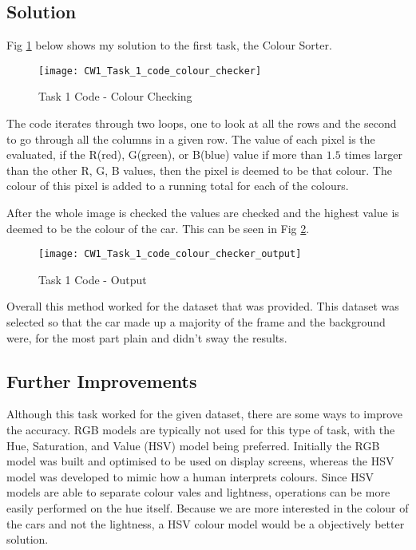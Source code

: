 \documentclass[conference]{IEEEtran}
\begin{document}
\subsection{Solution}
Fig \ref{fig:CW1_Task_1_code_colour_checker} below shows my solution to the first task, the Colour Sorter.

\begin{figure}[H]
\centerline{\texttt{[image: CW1\_Task\_1\_code\_colour\_checker]}}
\caption{Task 1 Code - Colour Checking}
\label{fig:CW1_Task_1_code_colour_checker}
\end{figure}

The code iterates through two loops, one to look at all the rows and the second to go through all the columns in a given row. 
The value of each pixel is the evaluated, if the R(red), G(green), or B(blue) value if more than $1.5$ times larger than the other R, G, B values, then the pixel is deemed to be that colour. 
The colour of this pixel is added to a running total for each of the colours. 

After the whole image is checked the values are checked and the highest value is deemed to be the colour of the car. This can be seen in Fig \ref{fig:CW1_Task_1_code_colour_checker_output}.

\begin{figure}[H]
\centerline{\texttt{[image: CW1\_Task\_1\_code\_colour\_checker\_output]}}
\caption{Task 1 Code - Output}
\label{fig:CW1_Task_1_code_colour_checker_output}
\end{figure}

Overall this method worked for the dataset that was provided.
This dataset was selected so that the car made up a majority of the frame and the background were, for the most part plain and didn't sway the results.


\subsection{Further Improvements}
Although this task worked for the given dataset, there are some ways to improve the accuracy. RGB models are typically not used for this type of task, with the Hue, Saturation, and Value (HSV) model being preferred. Initially the RGB model was built and optimised to be used on display screens, whereas the HSV model was developed to mimic how a human interprets colours. Since HSV models are able to separate colour vales and lightness, operations can be more easily performed on the hue itself. Because we are more interested in the colour of the cars and not the lightness, a HSV colour model would be a objectively better solution. \cite{ref:HSV_vs_RGB}
\end{document}
